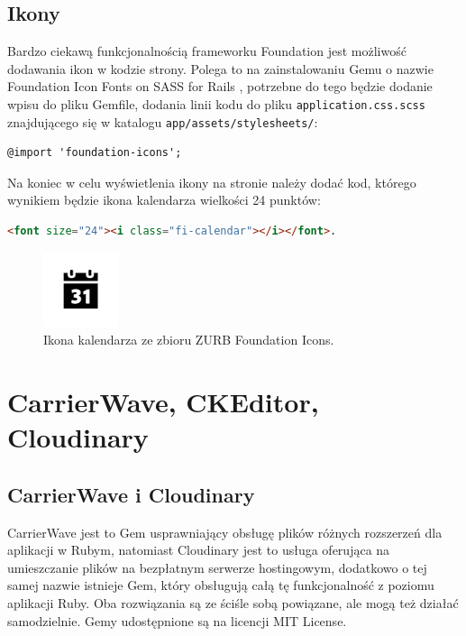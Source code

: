 \documentclass[openright]{xmgr}
\begin{document}
\subsection{Ikony}
Bardzo ciekawą funkcjonalnością frameworku Foundation jest możliwość dodawania ikon w kodzie strony. Polega to na zainstalowaniu Gemu o nazwie Foundation Icon Fonts on SASS for Rails \cite{icons}, potrzebne do tego będzie dodanie wpisu do pliku Gemfile, dodania linii kodu do pliku \texttt{application.css.scss} znajdującego się w katalogu \texttt{app/assets/stylesheets/}:
\begin{lstlisting}[language=html, caption={Przykładowe pole tekstowe}]
@import 'foundation-icons';
\end{lstlisting} 
Na koniec w celu wyświetlenia ikony na stronie należy dodać kod, którego wynikiem będzie ikona kalendarza wielkości 24 punktów: 
\begin{lstlisting}[language=html, caption={Przykładowe pole tekstowe}]
<font size="24"><i class="fi-calendar"></i></font>.
\end{lstlisting}

\begin{figure}[!tbh]
\centering
\includegraphics{fig/icon}
\caption{Ikona kalendarza ze zbioru ZURB Foundation Icons.}
\end{figure}

\newpage

\section{CarrierWave, CKEditor, Cloudinary}
\subsection{CarrierWave i Cloudinary}
CarrierWave \cite{carrierwave} jest to Gem usprawniający obsługę plików różnych rozszerzeń dla aplikacji w Rubym, natomiast Cloudinary jest to usługa oferująca na umieszczanie plików na bezpłatnym serwerze hostingowym, dodatkowo o tej samej nazwie istnieje Gem, który obsługują całą tę funkcjonalność z poziomu aplikacji Ruby. Oba rozwiązania są ze ściśle sobą powiązane, ale mogą też działać samodzielnie. Gemy udostępnione są na licencji MIT License. 
\end{document}

